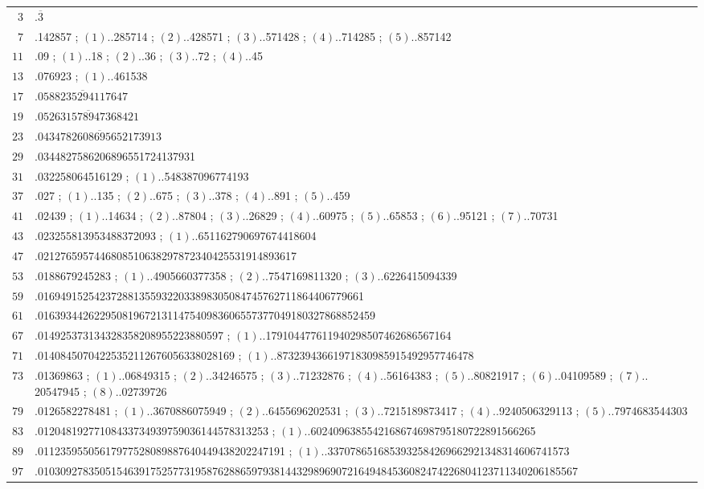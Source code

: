 \documentclass[12pt,a4paper]{article}
\theoremstyle{plain}
\theoremstyle{definition}
\theoremstyle{remark}
\begin{document}
\vspace{0.5em}
\begin{longtable}{r|l}
$3$ & $.\overline{3}$ \\
$7$ & $.$142857 ; $(1)..$285714 ; $(2)..$428571 ; $(3)..$571428 ; $(4)..$714285 ; $(5)..$857142 \\
$11$ & $.$09 ; $(1)..$18 ; $(2)..$36 ; $(3)..$72 ; $(4)..$45 \\
$13$ & $.$076923 ; $(1)..$461538 \\
$17$ & $.\overline{0588235294117647}$ \\
$19$ & $.\overline{052631578947368421}$ \\
$23$ & $.\overline{0434782608695652173913}$ \\
$29$ & $.$0344827586206896551724137931 \\
$31$ & $.$032258064516129 ; $(1)..$548387096774193 \\
$37$ & $.$027 ; $(1)..$135 ; $(2)..$675 ; $(3)..$378 ; $(4)..$891 ; $(5)..$459 \\
$41$ & $.$02439 ; $(1)..$14634 ; $(2)..$87804 ; $(3)..$26829 ; $(4)..$60975 ; $(5)..$65853 ; $(6)..$95121 ; $(7)..$70731 \\
$43$ & $.$023255813953488372093 ; $(1)..$651162790697674418604 \\
$47$ & $.$0212765957446808510638297872340425531914893617 \\
$53$ & $.$0188679245283 ; $(1)..$4905660377358 ; $(2)..$7547169811320 ; $(3)..$6226415094339 \\
$59$ & $.$0169491525423728813559322033898305084745762711864406779661 \\
$61$ & $.$016393442622950819672131147540983606557377049180327868852459 \\
$67$ & $.$014925373134328358208955223880597 ; $(1)..$179104477611940298507462686567164 \\
$71$ & $.$01408450704225352112676056338028169 ; $(1)..$87323943661971830985915492957746478 \\
$73$ & $.$01369863 ; $(1)..$06849315 ; $(2)..$34246575 ; $(3)..$71232876 ; $(4)..$56164383 ; $(5)..$80821917 ; $(6)..$04109589 ; $(7)..$20547945 ; $(8)..$02739726 \\
$79$ & $.$0126582278481 ; $(1)..$3670886075949 ; $(2)..$6455696202531 ; $(3)..$7215189873417 ; $(4)..$9240506329113 ; $(5)..$7974683544303 \\
$83$ & $.$01204819277108433734939759036144578313253 ; $(1)..$6024096385542168674698795180722891566265 \\
$89$ & $.$01123595505617977528089887640449438202247191 ; $(1)..$3370786516853932584269662921348314606741573 \\
$97$ & $.$010309278350515463917525773195876288659793814432989690721649484536082474226804123711340206185567 \\
\end{longtable}
\end{document}
